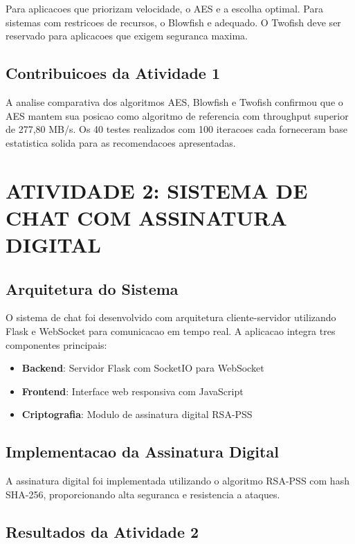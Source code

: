 \documentclass[12pt,a4paper,oneside]{article}
\begin{document}
Para aplicacoes que priorizam velocidade, o AES e a escolha optimal. Para sistemas com restricoes de recursos, o Blowfish e adequado. O Twofish deve ser reservado para aplicacoes que exigem seguranca maxima.

\subsection{Contribuicoes da Atividade 1}

A analise comparativa dos algoritmos AES, Blowfish e Twofish confirmou que o AES mantem sua posicao como algoritmo de referencia com throughput superior de 277,80 MB/s. Os 40 testes realizados com 100 iteracoes cada forneceram base estatistica solida para as recomendacoes apresentadas.

\section{ATIVIDADE 2: SISTEMA DE CHAT COM ASSINATURA DIGITAL}

\subsection{Arquitetura do Sistema}

O sistema de chat foi desenvolvido com arquitetura cliente-servidor utilizando Flask e WebSocket para comunicacao em tempo real. A aplicacao integra tres componentes principais:

\begin{itemize}
    \item \textbf{Backend}: Servidor Flask com SocketIO para WebSocket
    \item \textbf{Frontend}: Interface web responsiva com JavaScript
    \item \textbf{Criptografia}: Modulo de assinatura digital RSA-PSS
\end{itemize}

\subsection{Implementacao da Assinatura Digital}

A assinatura digital foi implementada utilizando o algoritmo RSA-PSS com hash SHA-256, proporcionando alta seguranca e resistencia a ataques.

\subsection{Resultados da Atividade 2}
\end{document}
